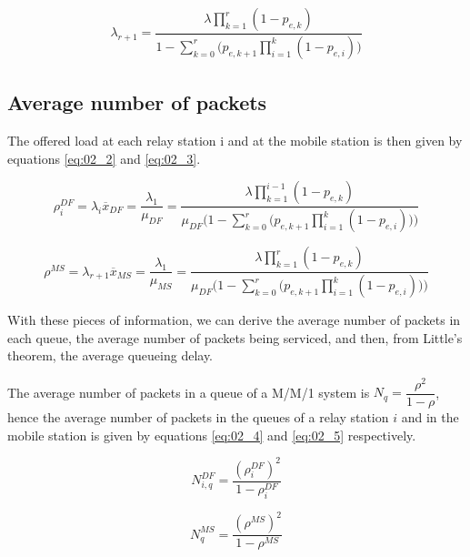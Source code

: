 \begin{align*}
  \lambda_{r+1} = \dfrac{\lambda \prod\limits_{k=1}^{r} (1 - p_{e,k})}{1 - \sum\limits_{k=0}^r \Big(p_{e,k+1} \prod\limits_{i=1}^k (1 - p_{e,i})\Big)}
\end{align*}


\subsection{Average number of packets}

The offered load at each relay station i and at the mobile station is then given
by equations \ref{eq:02_2} and \ref{eq:02_3}.

\begin{equation}
  \rho_i^{DF} = \lambda_i \overline{x}_{DF} = \dfrac{\lambda_1}{\mu_{DF}} =
  \dfrac{\lambda \prod\limits_{k=1}^{i-1} (1 - p_{e,k})}{\mu_{DF}\Bigg(1 - \sum\limits_{k=0}^r \Big(p_{e,k+1} \prod\limits_{i=1}^k (1 - p_{e,i})\Big)\Bigg)}
  \label{eq:02_2}
\end{equation}

\begin{equation}
  \rho^{MS} = \lambda_{r+1} \overline{x}_{MS} = \dfrac{\lambda_1}{\mu_{MS}} =
  \dfrac{\lambda \prod\limits_{k=1}^{r} (1 - p_{e,k})}{\mu_{DF}\Bigg(1 - \sum\limits_{k=0}^r \Big(p_{e,k+1} \prod\limits_{i=1}^k (1 - p_{e,i})\Big)\Bigg)}
  \label{eq:02_3}
\end{equation}











With these pieces of information, we can derive the average number of packets
in each queue, the average number of packets being serviced, and then, from
Little's theorem, the average queueing delay.

The average number of packets in a queue of a M/M/1 system is
$N_q = \dfrac{\rho^2}{1-\rho}$, hence the average number of packets in the queues
of a relay station $i$ and in the mobile station is given by equations
\ref{eq:02_4} and \ref{eq:02_5} respectively.

\begin{equation}
  N_{i,q}^{DF} = \dfrac{(\rho_i^{DF})^2}{1 - \rho_i^{DF}}
  \label{eq:02_4}
\end{equation}

\begin{equation}
  N_q^{MS} = \dfrac{(\rho^{MS})^2}{1 - \rho^{MS}}
  \label{eq:02_5}
\end{equation}

